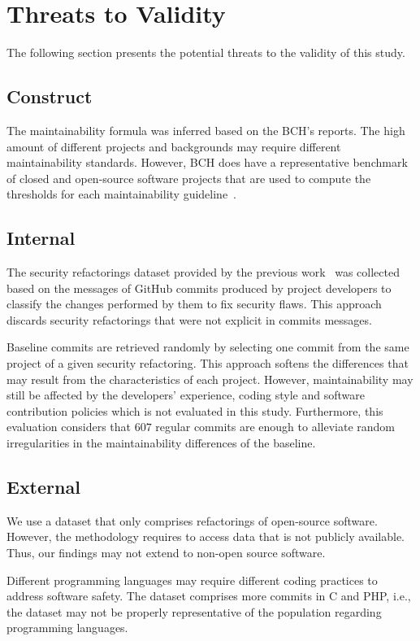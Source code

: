\documentclass[10pt,conference]{IEEEtran}
\begin{document}
\section{Threats to Validity}\label{sec:threats}
%
The following section presents the potential threats to the validity of this
study.
%
\subsection{Construct}
%
The maintainability formula was inferred based on the BCH's reports. The high
amount of different projects and backgrounds may require different
maintainability standards. However, BCH does have a representative benchmark of
closed and open-source software projects that are used to compute the
thresholds for each maintainability guideline~\cite{Visser:2016:OREILLY, Baggen2012}.

\subsection{Internal}

The security refactorings dataset provided by the previous
work~\cite{Reis:2017:IJSSE} was collected based on the messages of GitHub
commits produced by project developers to classify the changes performed by them
to fix security flaws. This approach discards security refactorings that were
not explicit in commits messages.

Baseline commits are retrieved randomly by selecting one commit from the same
project of a given security refactoring. This approach softens the differences
that may result from the characteristics of each project. However,
maintainability may still be affected by the developers' experience, coding
style and software contribution policies which is not evaluated in this study.
Furthermore, this evaluation considers that $607$ regular commits are enough to
alleviate random irregularities in the maintainability differences of the
baseline.

\subsection{External}

We use a dataset that only comprises refactorings of open-source software.
However, the methodology requires to access data that is not publicly available.
Thus, our findings may not extend to non-open source software.

Different programming languages may require different coding practices to
address software safety. The dataset comprises more commits in C and PHP, i.e.,
the dataset may not be properly representative of the population regarding
programming languages.
\end{document}

